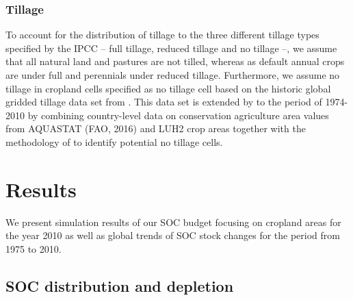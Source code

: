 \documentclass[gc, manuscript]{copernicus}
\begin{document}
\hypertarget{sec:tillage}{%
\subsubsection{Tillage}\label{sec:tillage}}

To account for the distribution of tillage to the three different tillage types specified by the IPCC -- full tillage, reduced tillage and no tillage --, we assume that all natural land and pastures are not tilled, whereas as default annual crops are under full and perennials under reduced tillage. Furthermore, we assume no tillage in cropland cells specified as no tillage cell based on the historic global gridded tillage data set from \citep{porwollik_generating_2018}. This data set is extended by to the period of 1974-2010 by combining country-level data on conservation agriculture area values from AQUASTAT (FAO, 2016) and LUH2 crop areas together with the methodology of \citep{porwollik_generating_2018} to identify potential no tillage cells.
\newpage

\hypertarget{results}{%
\section{Results}\label{results}}

We present simulation results of our SOC budget focusing on cropland areas for the year 2010 as well as global trends of SOC stock changes for the period from 1975 to 2010.

\hypertarget{soc-distribution-and-depletion}{%
\subsection{SOC distribution and depletion}\label{soc-distribution-and-depletion}}
\end{document}
